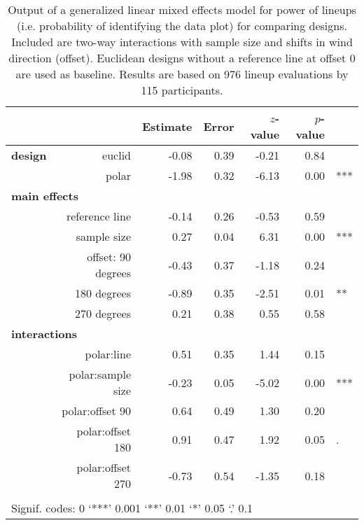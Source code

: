 \begin{table}[ht]
\begin{center}
\resizebox{\linewidth}{!} {
\begin{tabular}{rrrrrrl}
  \hline
& & Estimate & Error & $z$-value & $p$-value &\\ 
  \hline
\bf design & euclid & -0.08 & 0.39 & -0.21 & 0.84 &\\ 
&polar & -1.98 & 0.32 & -6.13 & 0.00 & ***\\ [3pt]
\multicolumn{2}{l}{\bf main effects} &&&&&\\
& reference line  & -0.14 & 0.26 & -0.53 & 0.59 & \\ [1pt]
&  sample size & 0.27 & 0.04 & 6.31 & 0.00 & ***\\[1pt]
 &offset:  90 degrees& -0.43 & 0.37 & -1.18 & 0.24 &\\ 
  & 180 degrees& -0.89 & 0.35 & -2.51 & 0.01 & **\\ 
  & 270 degrees& 0.21 & 0.38 & 0.55 & 0.58 &\\ [3pt]
\multicolumn{2}{l}{\bf interactions} &&&&&\\
&  polar:line & 0.51 & 0.35 & 1.44 & 0.15 &\\ [1pt]
&    polar:sample size & -0.23 & 0.05 & -5.02 & 0.00 & ***\\[1pt]
&    polar:offset 90 & 0.64 & 0.49 & 1.30 & 0.20 \\ 
&  polar:offset 180 & 0.91 & 0.47 & 1.92 & 0.05 & .\\ 
&    polar:offset 270 & -0.73 & 0.54 & -1.35 & 0.18 &\\
   \hline
\\[-5pt]
   \multicolumn{5}{l}{Signif. codes:  0 `***' 0.001 `**' 0.01 `*' 0.05 `.' 0.1}
\end{tabular}
}
\end{center}
\caption{\label{tbl:correct} Output of a generalized linear mixed effects model for power of lineups (i.e. probability of identifying the data plot) for comparing designs. Included are two-way interactions with sample size and shifts in wind direction (offset). Euclidean designs without a reference line at offset 0 are used as baseline.
 Results are based on  976 lineup evaluations by 115 participants. }
\end{table}


